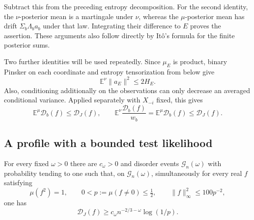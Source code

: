 Subtract this from the preceding entropy decomposition.  For the second
identity, the $\nu$-posterior mean is a martingale under $\nu$, whereas the
$\mu$-posterior mean has drift $\Sigma_b\Lambda_ba_b$ under that law.
Integrating their difference to $E$ proves the assertion.  These arguments
also follow directly by It\^o's formula for the finite posterior sums.

Two further identities will be used repeatedly.  Since $\mu_E$ is product,
binary Pinsker on each coordinate and entropy tensorization from below give
\begin{equation}
 \mathbb E^\nu\|a_E\|^2\le2H_E.
 \label{prof:product-mean}
\end{equation}
Also, conditioning additionally on the observations can only decrease an
averaged conditional variance.  Applied separately with $X_{-i}$ fixed, this
gives
\begin{equation}
 \mathbb E^\mu\mathcal D_b(f)\le\mathcal D_J(f),\qquad
 \mathbb E^\nu\frac{\mathcal D_b(f)}{w_b}
       =\mathbb E^\mu\mathcal D_b(f)\le\mathcal D_J(f).
 \label{prof:energy-under-observation}
\end{equation}

\subsection{A profile with a bounded test likelihood}

\begin{proposition}
\label{prof:restricted-profile}
For every fixed $\omega>0$ there are $c_\omega>0$ and disorder events
$\mathcal G_n(\omega)$ with probability tending to one such that, on
$\mathcal G_n(\omega)$, simultaneously for every real $f$ satisfying
\[
 \mu(f^2)=1,\qquad
 0<p:=\mu(f\ne0)\le\tfrac12,\qquad
 \|f\|_\infty^2\le100p^{-2},
\]
one has
\begin{equation}
 \mathcal D_J(f)\ge c_\omega n^{-2/3-\omega}\log(1/p).
 \label{prof:eq29}
\end{equation}
\end{proposition}

